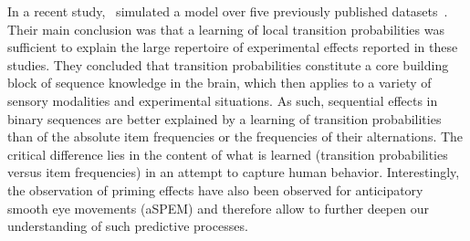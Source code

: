 \documentclass[12pt,english]{article}%
\newcommand{\citep}[1]{\parencite{#1}}
\newcommand{\citet}[1]{\textcite{#1}}
\begin{document}
In a recent study,~\citet{Meyniel16} simulated a model 
over five previously published datasets~\citep{Squires1976, Huettel2002, Kolossa2013, Cho2002, Falk1997}.
Their main conclusion was that
a learning of local transition probabilities
was sufficient to explain the large repertoire
of experimental effects reported in these studies.
They concluded that transition probabilities constitute
a core building block of sequence knowledge in the brain,
which then applies to a variety of sensory modalities and
experimental situations.
As such, sequential effects in binary sequences are better explained
by a learning of transition probabilities
than of the absolute item frequencies or the frequencies of their alternations.
The critical difference lies in the content
of what is learned (transition probabilities versus item frequencies)
in an attempt to capture human behavior.
Interestingly, the observation of priming effects
have also been observed for anticipatory smooth eye movements (aSPEM)
and therefore allow to further deepen our understanding of such predictive processes. %

\end{document}
